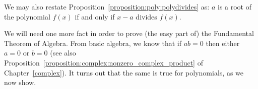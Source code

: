 We may also restate Proposition~\ref{proposition:poly:polydivides} as:  $a$ is a root of the polynomial $f(x)$ if and only if $x-a$ divides $f(x)$.

We will need one more fact in order to prove (the easy part of) the Fundamental Theorem of Algebra. From basic algebra, we know that if $ab=0$ then either $a=0$ or $b=0$ (see also 
Proposition~\ref{proposition:complex:nonzero_complex_product} of Chapter~\ref{complex}).  It turns out that the same is true for polynomials, as we now show.

